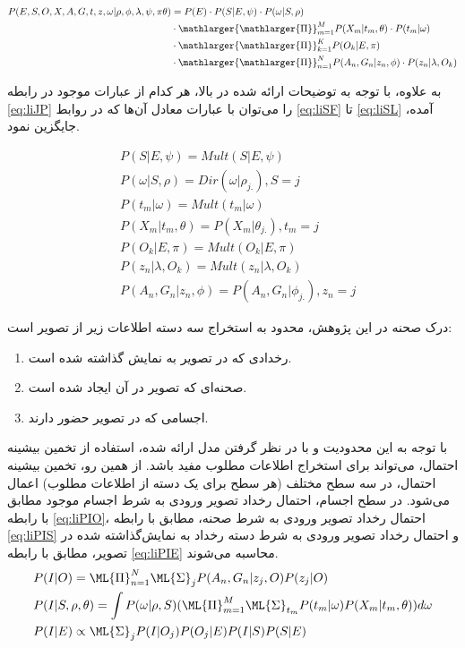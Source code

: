 \begin{enumerate}
\begin{equation}
\label{eq:liJP}\begin{split}
P(E,S,O,X,A,G,t,z,\omega |\rho ,\phi ,\lambda ,\psi ,\pi \theta) &= P(E)\cdot P(S|E,\psi)\cdot P(\omega|S,\rho) \\ 
&\cdot \mathlarger{\mathlarger{\Pi}}_{m=1}^M P(X_m|t_m,\theta)\cdot P(t_m|\omega) \\
&\cdot \mathlarger{\mathlarger{\Pi}}_{k=1}^K P(O_k|E,\pi)\\
&\cdot \mathlarger{\mathlarger{\Pi}}_{n=1}^N P(A_n,G_n|z_n,\phi)\cdot P(z_n|\lambda,O_k)
\end{split}
\end{equation}

به علاوه، با توجه به توضیحات ارائه شده در بالا، هر کدام از عبارات موجود در رابطه \ref{eq:liJP} را می‌توان با عبارات معادل آن‌ها که در روابط
\ref{eq:liSF}
تا
\ref{eq:liSL}
آمده، جایگزین نمود.

\begin{align}
&P(S|E,\psi) = Mult(S|E,\psi)
\label{eq:liSF}
\\
&P(\omega|S,\rho) = Dir(\omega|\rho_{j.}), S = j
\\
&P(t_m|\omega) = Mult(t_m|\omega)
\\
&P(X_m|t_m,\theta) = P(X_m|\theta_{j.}), t_m = j
\\
&P(O_k|E,\pi) = Mult(O_k|E,\pi)
\\
&P(z_n|\lambda,O_k) = Mult(z_n|\lambda,O_k)
\\
&P(A_n,G_n|z_n,\phi) = P(A_n,G_n|\phi_{j.}), z_n = j
\label{eq:liSL}
\end{align}

درک صحنه در این پژوهش، محدود به استخراج سه دسته اطلاعات زیر از تصویر است:

\begin{enumerate}
\item رخدادی که در تصویر به نمایش گذاشته شده است.
\item صحنه‌ای که تصویر در آن ایجاد شده است.
\item اجسامی که در تصویر حضور دارند.
\end{enumerate}

با توجه به این محدودیت و با در نظر گرفتن مدل ارائه شده، استفاده از تخمین بیشینه احتمال، می‌تواند برای استخراج اطلاعات مطلوب مفید باشد. از همین رو، تخمین بیشینه احتمال، در سه سطح مختلف (هر سطح برای یک دسته از اطلاعات مطلوب) اعمال می‌شود. در سطح اجسام، احتمال رخداد تصویر ورودی به شرط اجسام موجود مطابق با رابطه 
\ref{eq:liPIO}، احتمال رخداد تصویر ورودی به شرط صحنه، مطابق با رابطه 
\ref{eq:liPIS}
و احتمال رخداد تصویر ورودی به شرط دسته رخداد به نمایش‌گذاشته شده در تصویر، مطابق با رابطه 
\ref{eq:liPIE}
محاسبه می‌شوند.
\begin{align}
&P(I|O) = \ML{\Pi}_{n=1}^N \ML{\Sigma}_j P(A_n,G_n|z_j,O) P(z_j|O)
\label{eq:liPIO}
\\
&P(I|S,\rho,\theta) = \int P(\omega|\rho,S)(\ML{\Pi}_{m=1}^M \ML{\Sigma}_{t_m} P(t_m|\omega) P(X_m|t_m, \theta) ) d\omega
\label{eq:liPIS}
\\
&P(I|E) \propto \ML{\Sigma}_j P(I|O_j) P(O_j|E) P(I|S) P(S|E)
\label{eq:liPIE}
\end{align}


\end{enumerate}
